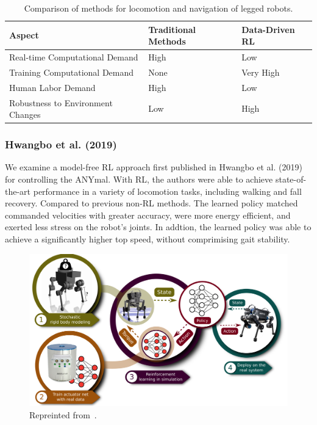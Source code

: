 \documentclass[12pt]{report}
\theoremstyle{definition}
\theoremstyle{remark}
\begin{document}
\begin{table}[H]
    \centering
    \caption{Comparison of methods for locomotion and navigation of legged robots.}
    \begin{tabular}{|l|l|l|}
        \hline
        \textbf{Aspect} & \textbf{Traditional Methods} & \textbf{Data-Driven RL} \\
        \hline
        Real-time Computational Demand & High & Low \\
        Training Computational Demand & None & Very High \\
        Human Labor Demand & High & Low \\
        Robustness to Environment Changes & Low & High \\
        \hline
    \end{tabular}
    \label{tab:methods}
\end{table}

\subsubsection{Hwangbo et al. (2019)}

We examine a model-free RL approach first published in Hwangbo et al. (2019)~\cite{hwangbo_learning_2019} for controlling the ANYmal. With RL, the authors were able to achieve state-of-the-art performance in a variety of locomotion tasks, including walking and fall recovery. Compared to previous non-RL methods. The learned policy matched commanded velocities with greater accuracy, were more energy efficient, and exerted less stress on the robot's joints. In addtion, the learned policy was able to achieve a significantly higher top speed, without comprimising gait stability.

\begin{figure}[h]
    \centering
    \includegraphics[width=\linewidth]{figs/anymal_RL.png}
    \caption{Repreinted from~\cite{hwangbo_learning_2019}.}
    \label{fig:anymal-RL}
\end{figure}
\end{document}
